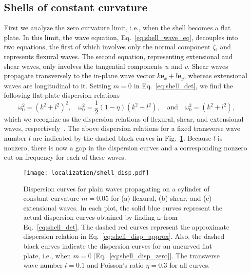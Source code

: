 \subsection{Shells of constant curvature}

First we analyze the zero curvature limit, i.e., when the shell becomes a flat plate.
In this limit, the wave equation, Eq.~\eqref{eq:shell_wave_eq}, decouples into two equations, the first of which involves only the normal component $\zeta$, and represents flexural waves.
The second equation, representing extensional and shear waves, only involves the tangential components $u$ and $v$.
Shear waves propagate transversely to the in-plane wave vector $k\bm{e}_{x} + l\bm{e}_{y}$, whereas extensional waves are longitudinal to it.
Setting $m = 0$ in Eq.~\eqref{eq:shell_det}, we find the following flat-plate dispersion relations
%
\begin{equation}
  \omega_{0}^{2} = \left(k^{2} + l^{2}\right)^{2},\quad
  \omega_{0}^{2} = \frac{1}{2}\left(1-\eta\right)\left(k^{2} + l^{2}\right),
  \quad\text{and}\quad
  \omega_{0}^{2} = \left(k^{2} + l^{2}\right),
  \label{eq:shell_disp_zero}
\end{equation}
%
which we recognize as the dispersion relations of flexural, shear, and extensional waves, respectively~\cite{fung1965}.
The above dispersion relations for a fixed transverse wave number $l$ are indicated by the dashed black curves in Fig.~\ref{fig:shell_disp}.
Because $l$ is nonzero, there is now a gap in the dispersion curves and a corresponding nonzero cut-on frequency for each of these waves.
%
\begin{figure}
  \begin{center}
    \texttt{[image: localization/shell\_disp.pdf]}
  \end{center}
  \caption{%
    Dispersion curves for plain waves propagating on a cylinder of constant curvature $m = 0.05$ for (a) flexural, (b) shear, and (c) extensional waves.
    In each plot, the solid blue curves represent the actual dispersion curves obtained by finding $\omega$ from Eq.~\eqref{eq:shell_det}.
    The dashed red curves represent the approximate dispersion relation in Eq.~\eqref{eq:shell_disp_approx}.
    Also, the dashed black curves indicate the dispersion curves for an uncurved flat plate, i.e., when $m = 0$ [Eq.~\eqref{eq:shell_disp_zero}].
    The transverse wave number $l = 0.1$ and Poisson's ratio $\eta = 0.3$ for all curves.
  }
  \label{fig:shell_disp}
\end{figure}

